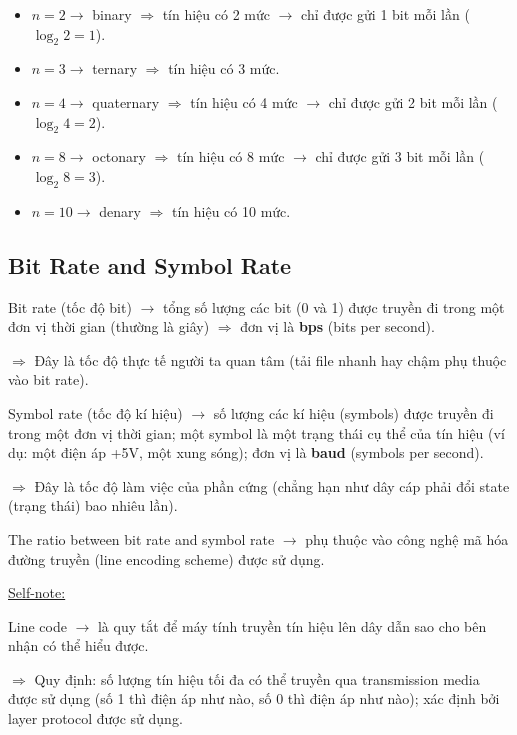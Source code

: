 \begin{itemize}
    \item $n = 2 \rightarrow$ binary $\Rightarrow$ tín hiệu có 2 mức $\rightarrow$ chỉ được gửi 1 bit mỗi lần ($\log_2 2 = 1$).
    \item $n = 3 \rightarrow$ ternary $\Rightarrow$ tín hiệu có 3 mức.
    \item $n = 4 \rightarrow$ quaternary $\Rightarrow$ tín hiệu có 4 mức $\rightarrow$ chỉ được gửi 2 bit mỗi lần ($\log_2 4 = 2$).
    \item $n = 8 \rightarrow$ octonary $\Rightarrow$ tín hiệu có 8 mức $\rightarrow$ chỉ được gửi 3 bit mỗi lần ($\log_2 8 = 3$).
    \item $n = 10 \rightarrow$ denary $\Rightarrow$ tín hiệu có 10 mức.
\end{itemize}

\subsection{Bit Rate and Symbol Rate}

\noindent
Bit rate (tốc độ bit) $\rightarrow$ tổng số lượng các bit (0 và 1) được truyền đi trong một đơn vị thời gian (thường là giây) $\Rightarrow$ đơn vị là \textbf{bps} (bits per second).

$\Rightarrow$ Đây là tốc độ thực tế người ta quan tâm (tải file nhanh hay chậm phụ thuộc vào bit rate).
\medskip

\noindent
Symbol rate (tốc độ kí hiệu) $\rightarrow$ số lượng các kí hiệu (symbols) được truyền đi trong một đơn vị thời gian; một symbol là một trạng thái cụ thể của tín hiệu (ví dụ: một điện áp +5V, một xung sóng); đơn vị là \textbf{baud} (symbols per second).

$\Rightarrow$ Đây là tốc độ làm việc của phần cứng (chẳng hạn như dây cáp phải đổi state (trạng thái) bao nhiêu lần).
\medskip

\noindent
The ratio between bit rate and symbol rate $\rightarrow$ phụ thuộc vào công nghệ mã hóa đường truyền (line encoding scheme) được sử dụng.
\medskip

\noindent
\underline{Self-note:} 
\medskip

\noindent
Line code $\rightarrow$ là quy tắt để máy tính truyền tín hiệu lên dây dẫn sao cho bên nhận có thể hiểu được.

$\Rightarrow$ Quy định: số lượng tín hiệu tối đa có thể truyền qua transmission media được sử dụng (số 1 thì điện áp như nào, số 0 thì điện áp như nào); xác định bởi layer protocol được sử dụng.
\medskip

